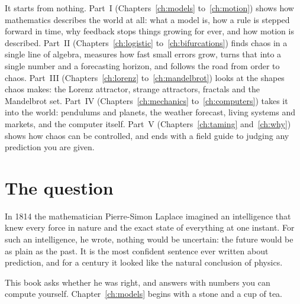 It starts from nothing. Part~I (Chapters~\ref{ch:models}
to~\ref{ch:motion}) shows how mathematics describes the world at all: what a
model is, how a rule is stepped forward in time, why feedback stops things
growing for ever, and how motion is described. Part~II
(Chapters~\ref{ch:logistic} to~\ref{ch:bifurcations}) finds chaos in a single
line of algebra, measures how fast small errors grow, turns that into a
single number and a forecasting horizon, and follows the road from order to
chaos. Part~III (Chapters~\ref{ch:lorenz} to~\ref{ch:mandelbrot}) looks at the
shapes chaos makes: the Lorenz attractor, strange attractors, fractals and the
Mandelbrot set. Part~IV (Chapters~\ref{ch:mechanics} to~\ref{ch:computers})
takes it into the world: pendulums and planets, the weather forecast, living
systems and markets, and the computer itself. Part~V
(Chapters~\ref{ch:taming} and~\ref{ch:why}) shows how chaos can be controlled,
and ends with a field guide to judging any prediction you are given.

\section*{The question}

In 1814 the mathematician Pierre-Simon Laplace imagined an intelligence that
knew every force in nature and the exact state of everything at one instant.
For such an intelligence, he wrote, nothing would be uncertain: the future
would be as plain as the past. It is the most confident sentence ever
written about prediction, and for a century it looked like the natural
conclusion of physics.

This book asks whether he was right, and answers with numbers you can
compute yourself. Chapter~\ref{ch:models} begins with a stone and a cup of
tea.
